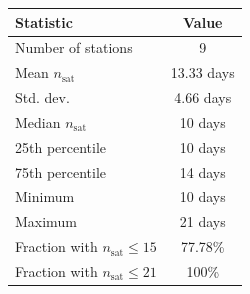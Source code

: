 \begin{tabular}{lc}
\toprule
\textbf{Statistic} & \textbf{Value} \\
\midrule
Number of stations & 9 \\
Mean $n_{\mathrm{sat}}$ & 13.33 days \\
Std. dev. & 4.66 days \\
Median $n_{\mathrm{sat}}$ & 10 days \\
25th percentile & 10 days \\
75th percentile & 14 days \\
Minimum & 10 days \\
Maximum & 21 days \\
Fraction with $n_{\mathrm{sat}} \leq 15$ & 77.78\% \\
Fraction with $n_{\mathrm{sat}} \leq 21$ & 100\% \\
\bottomrule
\end{tabular}
